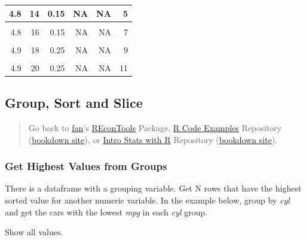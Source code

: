 \documentclass[
]{book}
\begin{document}
\begin{table}[!h]
{\begin{tabular}{r|r|r|r|r|r}
\hline
4.8 & 14 & 0.15 & NA & NA & 5\\
\hline
\cellcolor{gray!6}{4.8} & \cellcolor{gray!6}{15} & \cellcolor{gray!6}{0.15} & \cellcolor{gray!6}{NA} & \cellcolor{gray!6}{NA} & \cellcolor{gray!6}{6}\\
\hline
4.8 & 16 & 0.15 & NA & NA & 7\\
\hline
\cellcolor{gray!6}{4.9} & \cellcolor{gray!6}{17} & \cellcolor{gray!6}{0.25} & \cellcolor{gray!6}{NA} & \cellcolor{gray!6}{NA} & \cellcolor{gray!6}{8}\\
\hline
4.9 & 18 & 0.25 & NA & NA & 9\\
\hline
\cellcolor{gray!6}{4.9} & \cellcolor{gray!6}{19} & \cellcolor{gray!6}{0.25} & \cellcolor{gray!6}{NA} & \cellcolor{gray!6}{NA} & \cellcolor{gray!6}{10}\\
\hline
4.9 & 20 & 0.25 & NA & NA & 11\\
\hline
\end{tabular}}
\end{table}

\hypertarget{group-sort-and-slice}{%
\subsection{Group, Sort and Slice}\label{group-sort-and-slice}}

\begin{quote}
Go back to \href{http://fanwangecon.github.io/}{fan}'s \href{https://fanwangecon.github.io/REconTools/}{REconTools} Package, \href{https://fanwangecon.github.io/R4Econ/}{R Code Examples} Repository (\href{https://fanwangecon.github.io/R4Econ/bookdown}{bookdown site}), or \href{https://fanwangecon.github.io/Stat4Econ/}{Intro Stats with R} Repository (\href{https://fanwangecon.github.io/Stat4Econ/bookdown}{bookdown site}).
\end{quote}

\hypertarget{get-highest-values-from-groups}{%
\subsubsection{Get Highest Values from Groups}\label{get-highest-values-from-groups}}

There is a dataframe with a grouping variable. Get N rows that have the highest sorted value for another numeric variable. In the example below, group by \emph{cyl} and get the cars with the lowest \emph{mpg} in each \emph{cyl} group.

Show all values.
\end{document}
